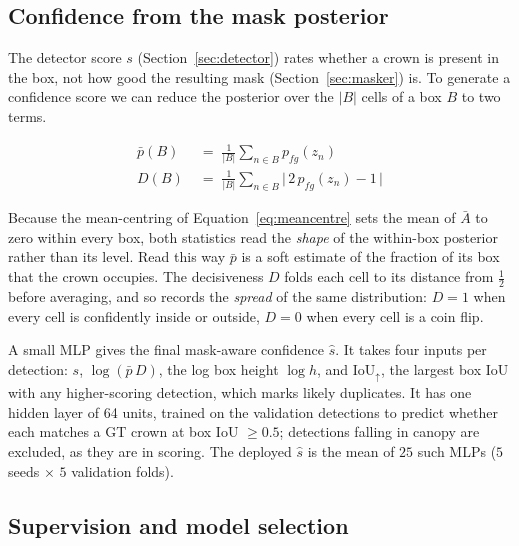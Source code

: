 \documentclass[remotesensing,article,submit,moreauthors]{Definitions/mdpi}
\begin{document}
\subsection{Confidence from the mask posterior}
\label{sec:scorer}

The detector score $s$ (Section~\ref{sec:detector}) rates whether a crown is present in the box, not how good the resulting mask (Section~\ref{sec:masker}) is. To generate a confidence score we can reduce the posterior over the $\lvert B \rvert$ cells of a box $B$ to two terms.

\begin{align}
\bar p(B) &\;=\; \frac{1}{\lvert B \rvert} \sum_{n \in B} p_{fg}(z_n)
\label{eq:meanpost}\\[2pt]
D(B) &\;=\; \frac{1}{\lvert B \rvert} \sum_{n \in B}
              \bigl\lvert\, 2\,p_{fg}(z_n) - 1 \,\bigr\rvert
\label{eq:decisive}
\end{align}

Because the mean-centring of Equation~\eqref{eq:meancentre} sets the mean of $\bar A$ to zero within every box, both statistics read the \emph{shape} of the within-box posterior rather than its level. Read this way $\bar p$ is a soft estimate of the fraction of its box that the crown occupies. The decisiveness $D$ folds each cell to its distance from $\tfrac12$ before averaging, and so records the \emph{spread} of the same distribution: $D = 1$ when every cell is confidently inside or outside, $D = 0$ when every cell is a coin flip.

A small MLP gives the final mask-aware confidence $\hat s$. It takes four inputs per detection: $s$, $\log(\bar p\, D)$, the log box height $\log h$, and $\mathrm{IoU}_{\uparrow}$, the largest box IoU with any higher-scoring detection, which marks likely duplicates. It has one hidden layer of 64 units, trained on the validation detections to predict whether each matches a GT crown at box IoU $\geq 0.5$; detections falling in canopy are excluded, as they are in scoring. The deployed $\hat s$ is the mean of $25$ such MLPs ($5$ seeds $\times$ $5$ validation folds).


\subsection{Supervision and model selection}
\label{sec:labels}
\end{document}
